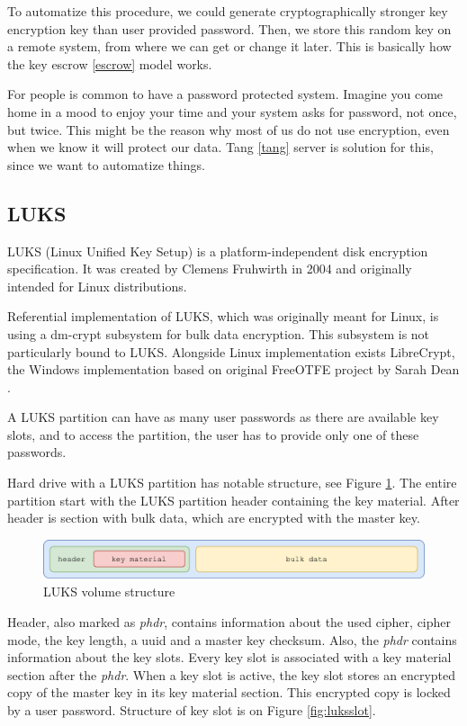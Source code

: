 \documentclass[../xdudla00-porting-Tang-to-Open-WRT.tex]{subfiles}
\begin{document}
To automatize this procedure, we could generate cryptographically stronger key encryption key than user provided password.
Then, we store this random key on a remote system, from where we can get or change it later.
This is basically how the key escrow \ref{escrow} model works.

For people is common to have a password protected system.
Imagine you come home in a mood to enjoy your time and your system asks for password, not once, but twice.
This might be the reason why most of us do not use encryption, even when we know it will protect our data.
Tang \ref{tang} server is solution for this, since we want to automatize things.

\subsection{LUKS}

LUKS (Linux Unified Key Setup) is a platform-independent disk encryption specification. 
It was created by Clemens Fruhwirth in 2004 and originally intended for Linux distributions.

Referential implementation of LUKS, which was originally meant for Linux, is using a dm-crypt subsystem for bulk data encryption.
This subsystem is not particularly bound to LUKS.
Alongside Linux implementation exists LibreCrypt, the Windows implementation based on original FreeOTFE project by Sarah Dean \cite{LUKS}.

A LUKS partition can have as many user passwords as there are available key slots, and to access the partition, the user has to provide only one of these passwords.

Hard drive with a LUKS partition has notable structure, see Figure \ref{fig:luksvol}.
The entire partition start with the LUKS partition header containing the key material. 
After header is section with bulk data, which are encrypted with the master key.

\begin{figure}[h]
    \centering
    \includegraphics[scale=0.7]{figures/LUKSdrive.pdf}
    \caption{LUKS volume structure}
    \label{fig:luksvol}
\end{figure}

Header, also marked as {\it phdr}, contains information about the used cipher, cipher mode, the key length, a uuid and a master key checksum.
Also, the {\it phdr} contains information about the key slots. 
Every key slot is associated with a key material section after the {\it phdr}.  
When a key slot is active, the key slot stores an encrypted copy of the master key in its key material section.
This encrypted copy is locked by a user password.
Structure of key slot is on Figure \ref{fig:luksslot}.
\end{document}
